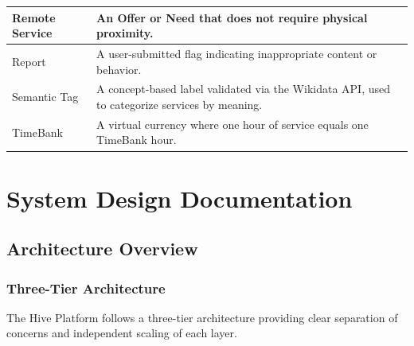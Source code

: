 \documentclass[10pt,a4paper]{report}
\begin{document}
\begin{longtable}{|p{3.5cm}|p{11cm}|}
    \hline
    Remote Service            & An Offer or Need that does not require physical proximity.                                                                                \\
    \hline
    Report                    & A user-submitted flag indicating inappropriate content or behavior.                                                                       \\
    \hline
    Semantic Tag              & A concept-based label validated via the Wikidata API, used to categorize services by meaning.                                            \\
    \hline
    TimeBank                  & A virtual currency where one hour of service equals one TimeBank hour.                                                                    \\
    \hline
\end{longtable}

\chapter{System Design Documentation}
\label{chap:design}

\section{Architecture Overview}

\subsection{Three-Tier Architecture}

The Hive Platform follows a three-tier architecture providing clear separation of concerns and independent scaling of each layer.
\end{document}
